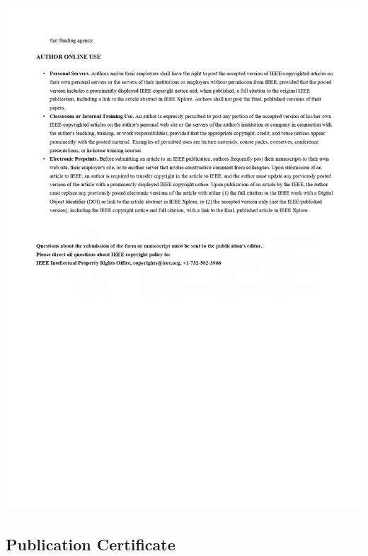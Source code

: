 \documentclass[12pt,a4paper]{report}
\begin{document}
\includegraphics[scale =0.7]{images/copyright/publication/PublicationCopyright/PublicationCopyright_page-0003.jpg}
\newpage


\subsection {Publication Certificate}
\end{document}

